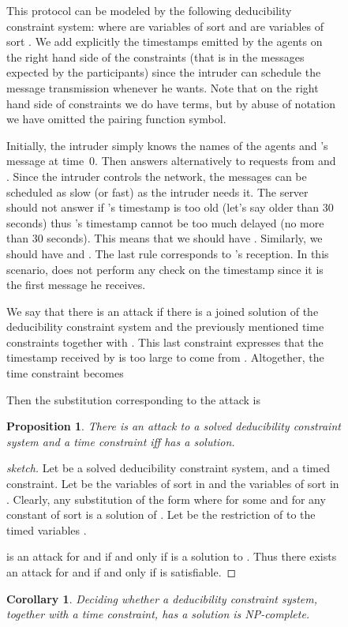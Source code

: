 \documentclass[acmtocl,acmnow]{acmtrans2m}
\newtheorem{corollary}[theorem]{Corollary}
\newtheorem{proposition}[theorem]{Proposition}
\newcommand{\comment}[1]{}
\newcommand{\dedsys}[1]{deducibility constraint system}
\begin{document}
\begin{figure}[t]
{{\begin{example}
This protocol can be modeled by the following \dedsys{}:
where  are variables of sort  and  are variables of sort . We add explicitly the
timestamps emitted by the agents on the right hand side of the
constraints (that is in the messages expected by the participants)
since the intruder can schedule the message transmission whenever he
wants. Note that on the right hand side of constraints we do have
terms, but by abuse of notation we have omitted the pairing function symbol.

Initially, the intruder simply knows the names of the agents and 's message at time~0. Then  answers
alternatively to requests from  and . Since the intruder controls the network, the messages can be
scheduled as slow (or fast) as the intruder needs it. The server  should not answer
if 's timestamp is too old (let's say older than 30 seconds) thus 's timestamp cannot be too much
delayed (no more than 30 seconds). This means that we should have . Similarly, we
should have  and . The last rule corresponds to 's
reception. In this scenario,  does not perform any check on the timestamp since it is the first message he
receives.

We say that there is an attack if there is a joined solution of the
\dedsys{} and  the previously mentioned time
constraints together with . This last constraint expresses that the 
timestamp received by  is too
large to come from .
Altogether, the time constraint becomes

Then the substitution corresponding to the attack is

\comment{}
\end{example}



\begin{proposition}\label{prop:timed}
There is an attack to a solved \dedsys{} and a time constraint  iff
 has a solution. 
\end{proposition}
\begin{proof}[sketch]
Let  be a solved \dedsys{},  and  a timed constraint. Let
 be the variables of sort  in  and  the variables of sort 
in . Clearly, any substitution  of the form  where  for some
 and  for  any constant of sort  is a solution of . Let  be the restriction of  to the timed variables
.

  is an attack for  and  if and only if  is a solution to . 
Thus there
exists an attack for  and   if and only if  is satisfiable. 
\end{proof}

\begin{corollary}
Deciding whether a \dedsys{}, together with a time constraint, has a solution
is NP-complete. 
\end{corollary}

}}
\end{figure}
\end{document}
